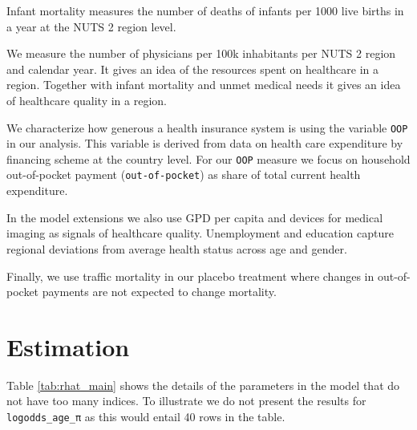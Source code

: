 \documentclass[a4paper,12pt]{article}
\begin{document}
Infant mortality measures the number of deaths of infants per 1000 live births in a year at the NUTS 2 region level.

We measure the number of physicians per 100k inhabitants per NUTS 2 region and calendar year. It gives an idea of the resources spent on healthcare in a region. Together with infant mortality and unmet medical needs it gives an idea of healthcare quality in a region.

We characterize how generous a health insurance system is using the variable \texttt{OOP} in our analysis. This variable is derived from data on health care expenditure by financing scheme at the country level. For our \texttt{OOP} measure we focus on household out-of-pocket payment (\texttt{out-of-pocket}) as share of total current health expenditure.

In the model extensions we also use GPD per capita and devices for medical imaging as signals of healthcare quality. Unemployment and education capture regional deviations from average health status across age and gender.

Finally, we use traffic mortality in our placebo treatment where changes in out-of-pocket payments are not expected to change mortality.
\section{Estimation}
\label{sec:orgba95271}

Table \ref{tab:rhat_main} shows the details of the parameters in the model that do not have too many indices. To illustrate we do not present the results for \texttt{logodds\_age\_π} as this would entail 40 rows in the table.
\end{document}
